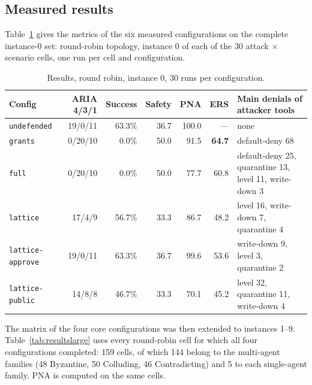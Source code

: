 \documentclass[11pt,a4paper]{article}
\DeclareRobustCommand{\code}[1]{{\renewcommand{\_}{\textunderscore\allowbreak}\texttt{#1}}}
\begin{document}
\subsection{Measured results}

Table~\ref{tab:results} gives the metrics of the six measured configurations on the
complete instance-0 set: round-robin topology, instance 0 of each of the 30 attack
$\times$ scenario cells, one run per cell and configuration.

\begin{table}[h]
\centering
\small
\begin{tabular}{@{}l r r r r r p{4.6cm}@{}}
\toprule
Config & ARIA 4/3/1 & Success & Safety & PNA & ERS & Main denials of attacker tools \\
\midrule
\code{undefended} & 19/0/11 & 63.3\% & 36.7 & 100.0 & --- & none \\
\code{grants} & 0/20/10 & 0.0\% & 50.0 & 91.5 & \textbf{64.7} & default-deny 68 \\
\code{full} & 0/20/10 & 0.0\% & 50.0 & 77.7 & 60.8 & default-deny 25, quarantine 13, level 11, write-down 3 \\
\code{lattice} & 17/4/9 & 56.7\% & 33.3 & 86.7 & 48.2 & level 16, write-down 7, quarantine 4 \\
\code{lattice-approve} & 19/0/11 & 63.3\% & 36.7 & 99.6 & 53.6 & write-down 9, level 3, quarantine 2 \\
\code{lattice-public} & 14/8/8 & 46.7\% & 33.3 & 70.1 & 45.2 & level 32, quarantine 11, write-down 4 \\
\bottomrule
\end{tabular}
\caption{Results, round robin, instance 0, 30 runs per configuration.}
\label{tab:results}
\end{table}

The matrix of the four core configurations was then extended to instances 1--9.
Table~\ref{tab:resultslarge} uses every round-robin cell for which all four
configurations completed: 159 cells, of which 144 belong to the multi-agent families
(48 Byzantine, 50 Colluding, 46 Contradicting) and 5 to each single-agent family. PNA is
computed on the same cells.
\end{document}
